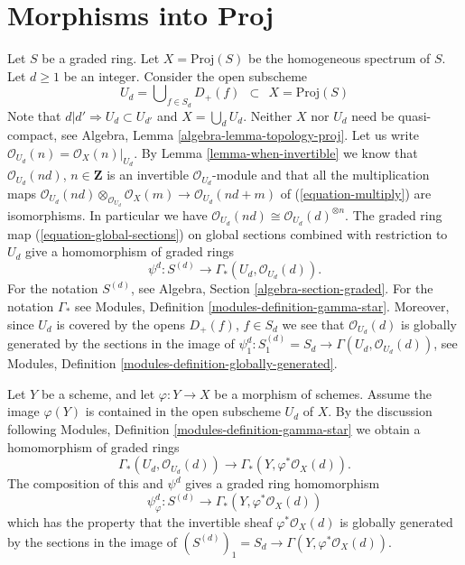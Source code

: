 \section{Morphisms into Proj}
\label{section-morphisms-proj}

\noindent
Let $S$ be a graded ring.
Let $X = \text{Proj}(S)$ be the homogeneous spectrum of $S$.
Let $d \geq 1$ be an integer.
Consider the open subscheme
\begin{equation}
\label{equation-Ud}
U_d = \bigcup\nolimits_{f  \in S_d} D_{+}(f)
\ \ \subset\ \
X = \text{Proj}(S)
\end{equation}
Note that $d | d' \Rightarrow U_d \subset U_{d'}$ and
$X = \bigcup_d U_d$. Neither $X$ nor $U_d$ need
be quasi-compact, see Algebra, Lemma \ref{algebra-lemma-topology-proj}.
Let us write $\mathcal{O}_{U_d}(n) = \mathcal{O}_X(n)|_{U_d}$.
By Lemma \ref{lemma-when-invertible}
we know that $\mathcal{O}_{U_d}(nd)$, $n \in \mathbf{Z}$
is an invertible $\mathcal{O}_{U_d}$-module and
that all the multiplication maps
$\mathcal{O}_{U_d}(nd) \otimes_{\mathcal{O}_{U_d}} \mathcal{O}_X(m)
\to \mathcal{O}_{U_d}(nd + m)$ of
(\ref{equation-multiply}) are isomorphisms. In particular we have
$\mathcal{O}_{U_d}(nd) \cong \mathcal{O}_{U_d}(d)^{\otimes n}$.
The graded ring map (\ref{equation-global-sections}) on global sections
combined with restriction to $U_d$ give a homomorphism of graded rings
\begin{equation}
\label{equation-psi-d}
\psi^d : S^{(d)} \longrightarrow \Gamma_*(U_d, \mathcal{O}_{U_d}(d)).
\end{equation}
For the notation $S^{(d)}$, see Algebra, Section \ref{algebra-section-graded}.
For the notation $\Gamma_*$ see
Modules, Definition \ref{modules-definition-gamma-star}.
Moreover, since $U_d$ is covered by the opens $D_{+}(f)$, $f \in S_d$
we see that $\mathcal{O}_{U_d}(d)$ is globally generated
by the sections in the image of
$\psi^d_1 : S^{(d)}_1 = S_d \to \Gamma(U_d, \mathcal{O}_{U_d}(d))$, see
Modules, Definition \ref{modules-definition-globally-generated}.

\medskip\noindent
Let $Y$ be a scheme, and let $\varphi : Y \to X$ be a morphism of schemes.
Assume the image $\varphi(Y)$ is contained in the open subscheme
$U_d$ of $X$.
By the discussion following
Modules, Definition \ref{modules-definition-gamma-star}
we obtain a homomorphism of graded rings
$$
\Gamma_*(U_d, \mathcal{O}_{U_d}(d))
\longrightarrow
\Gamma_*(Y, \varphi^*\mathcal{O}_X(d)).
$$
The composition of this and $\psi^d$ gives a graded ring
homomorphism
\begin{equation}
\label{equation-psi-phi-d}
\psi_\varphi^d :
S^{(d)}
\longrightarrow
\Gamma_*(Y, \varphi^*\mathcal{O}_X(d))
\end{equation}
which has the property that the invertible sheaf
$\varphi^*\mathcal{O}_X(d)$ is globally generated
by the sections in the image of
$(S^{(d)})_1 = S_d \to \Gamma(Y, \varphi^*\mathcal{O}_X(d))$.


